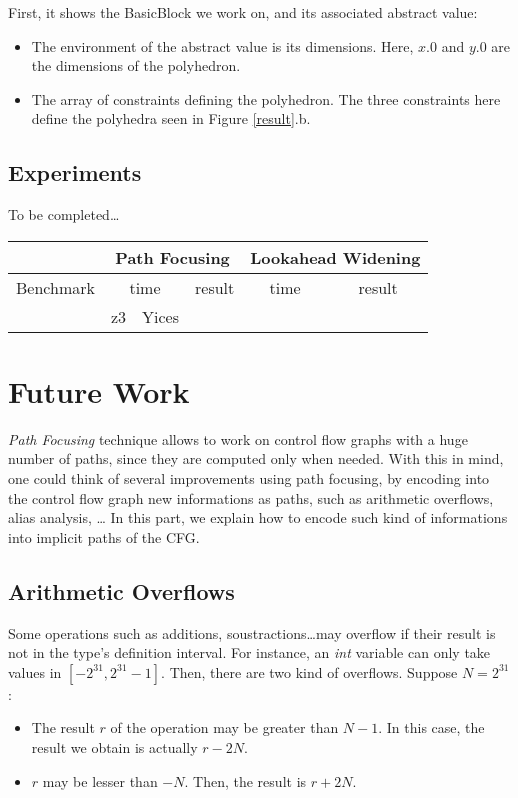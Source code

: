 \documentclass[a4paper,english,titlepage,11pt]{report}
\begin{document}
First, it shows the BasicBlock we work on, and its associated abstract value:
\begin{itemize}
\item The environment of the abstract value is its dimensions. Here, $x.0$ and
$y.0$ are the dimensions of the polyhedron.
\item The array of constraints defining the polyhedron. The three constraints
here define the polyhedra seen in Figure \ref{result}.b.
\end{itemize}

 \section{Experiments}

	To be completed\dots

\begin{tabular}{|c|c|c|c||c|c|} \hline

			& \multicolumn{3}{c||}{Path Focusing} & \multicolumn{2}{c|}{Lookahead
			Widening} \\ \hline
Benchmark	& \multicolumn{2}{c|}{time} & result	& time	& result	\\
\cline{2-3}	& z3 & Yices				& & & \\
\hline



\end{tabular}

\chapter{Future Work}
\label{future}
\emph{Path Focusing} technique allows to work on control flow graphs with a huge
number of paths, since they are computed only when needed. With this in mind,
one could think of several improvements using path focusing, by encoding into
the control flow graph new informations as paths, such as arithmetic overflows,
alias analysis, \dots
In this part, we explain how to encode such kind of informations into implicit
paths of the CFG.

	\section{Arithmetic Overflows}

Some operations such as additions, soustractions\dots may overflow if their
result is not in the type's definition interval. For instance, an
\emph{int} variable can only take values in $[-2^{31}, 2^{31} -1]$. Then, there
are two kind of overflows. Suppose $N=2^{31}$:
\begin{itemize}
\item The result $r$ of the operation may be greater than $N-1$. In this case,
the result we obtain is actually $r-2N$.
\item $r$ may be lesser than $-N$. Then, the result is $r+2N$.
\end{itemize}
\end{document}
